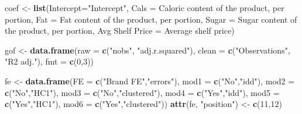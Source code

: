 \documentclass[
]{article}
\newenvironment{Shaded}{\begin{snugshade}}{\end{snugshade}}
\newcommand{\AttributeTok}[1]{\textcolor[rgb]{0.13,0.29,0.53}{#1}}
\newcommand{\DecValTok}[1]{\textcolor[rgb]{0.00,0.00,0.81}{#1}}
\newcommand{\FunctionTok}[1]{\textcolor[rgb]{0.13,0.29,0.53}{\textbf{#1}}}
\newcommand{\NormalTok}[1]{#1}
\newcommand{\OtherTok}[1]{\textcolor[rgb]{0.56,0.35,0.01}{#1}}
\newcommand{\StringTok}[1]{\textcolor[rgb]{0.31,0.60,0.02}{#1}}
\begin{document}
\begin{Shaded}
\begin{Highlighting}[]
\NormalTok{coef }\OtherTok{\textless{}{-}} \FunctionTok{list}\NormalTok{(}\StringTok{\textquotesingle{}Intercept\textquotesingle{}}\OtherTok{=}\StringTok{"Intercept"}\NormalTok{,}
              \StringTok{\textquotesingle{}Cals\textquotesingle{}} \OtherTok{=} \StringTok{\textquotesingle{}Caloric content of the product, per portion\textquotesingle{}}\NormalTok{,}
             \StringTok{\textquotesingle{}Fat\textquotesingle{}} \OtherTok{=} \StringTok{\textquotesingle{}Fat content of the product, per portion\textquotesingle{}}\NormalTok{,}
             \StringTok{\textquotesingle{}Sugar\textquotesingle{}} \OtherTok{=} \StringTok{\textquotesingle{}Sugar content of the product, per portion\textquotesingle{}}\NormalTok{,}
             \StringTok{\textquotesingle{}Avg Shelf Price\textquotesingle{}} \OtherTok{=} \StringTok{\textquotesingle{}Average shelf price\textquotesingle{}}\NormalTok{)}

\NormalTok{gof }\OtherTok{\textless{}{-}} \FunctionTok{data.frame}\NormalTok{(}\AttributeTok{raw =} \FunctionTok{c}\NormalTok{(}\StringTok{"nobs"}\NormalTok{, }\StringTok{"adj.r.squared"}\NormalTok{),}
                  \AttributeTok{clean =} \FunctionTok{c}\NormalTok{(}\StringTok{"Observations"}\NormalTok{, }\StringTok{"R2 adj."}\NormalTok{),}
                  \AttributeTok{fmt =} \FunctionTok{c}\NormalTok{(}\DecValTok{0}\NormalTok{,}\DecValTok{3}\NormalTok{))}

\NormalTok{fe }\OtherTok{\textless{}{-}} \FunctionTok{data.frame}\NormalTok{(}\AttributeTok{FE =} \FunctionTok{c}\NormalTok{(}\StringTok{"Brand FE"}\NormalTok{,}\StringTok{"errors"}\NormalTok{),}
                 \AttributeTok{mod1 =} \FunctionTok{c}\NormalTok{(}\StringTok{"No"}\NormalTok{,}\StringTok{"idd"}\NormalTok{),}
                 \AttributeTok{mod2 =} \FunctionTok{c}\NormalTok{(}\StringTok{"No"}\NormalTok{,}\StringTok{"HC1"}\NormalTok{),}
                 \AttributeTok{mod3 =} \FunctionTok{c}\NormalTok{(}\StringTok{"No"}\NormalTok{,}\StringTok{"clustered"}\NormalTok{),}
                 \AttributeTok{mod4 =} \FunctionTok{c}\NormalTok{(}\StringTok{"Yes"}\NormalTok{,}\StringTok{"idd"}\NormalTok{),}
                 \AttributeTok{mod5 =} \FunctionTok{c}\NormalTok{(}\StringTok{"Yes"}\NormalTok{,}\StringTok{"HC1"}\NormalTok{),}
                 \AttributeTok{mod6 =} \FunctionTok{c}\NormalTok{(}\StringTok{"Yes"}\NormalTok{,}\StringTok{"clustered"}\NormalTok{))}
\FunctionTok{attr}\NormalTok{(fe, }\StringTok{"position"}\NormalTok{) }\OtherTok{\textless{}{-}} \FunctionTok{c}\NormalTok{(}\DecValTok{11}\NormalTok{,}\DecValTok{12}\NormalTok{)}


\end{Highlighting}
\end{Shaded}
\end{document}
